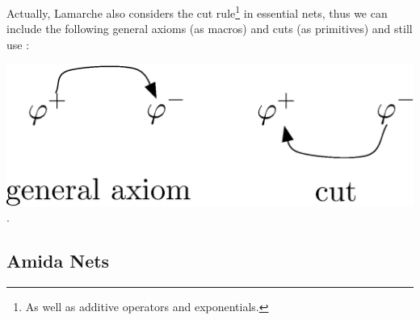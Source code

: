  Actually, Lamarche also considers the cut rule\footnote{As well as
 additive operators and exponentials.} in essential nets, thus
 we can include the following general axioms (as macros) and cuts (as
 primitives) and still use :
 \begin{center}
  \includegraphics[scale=0.4]{general-axiom-cut.eps}\enspace.
 \end{center}

\subsection{Amida Nets}

